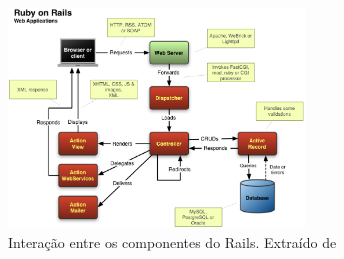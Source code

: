 \graphicspath{{figuras/}}
\begin{figure}[H]
\centering
\includegraphics[width=0.7\textwidth]{rails-overview}
\caption{Interação entre os componentes do Rails. Extraído  de \cite{mejia2011rails}}
\label{fig:rails-architecture}
\end{figure}


